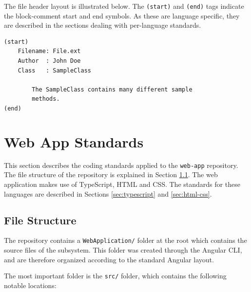 \documentclass{article}
\begin{document}
    The file header layout is illustrated below. The \texttt{(start)} and
    \texttt{(end)} tags indicate the block-comment start and end symbols.
    As these are language specific, they are described in the sections
    dealing with per-language standards.

    \begin{lstlisting}
(start)
    Filename: File.ext
    Author  : John Doe
    Class   : SampleClass

        The SampleClass contains many different sample
        methods.
(end)
    \end{lstlisting}

    \newpage


    \section{Web App Standards}
    \label{sec:web-app}

    This section describes the coding standards applied to the \texttt{web-app}
    repository. %
    The file structure of the repository is explained in
    Section \ref{sec:wa-struc}. The web application makes use of TypeScript,
    HTML and CSS. The standards for these languages are described in Sections
    \ref{sec:typescript} and \ref{sec:html-css}.



    \subsection{File Structure}
    \label{sec:wa-struc}

    The repository contains a \texttt{WebApplication/} folder at the root which
    contains the source files of the subsystem. This folder was created through
    the Angular CLI, and are therefore organized according to the standard
    Angular layout.

    The most important folder is the \texttt{src/} folder, which contains the
    following notable locations:
\end{document}
